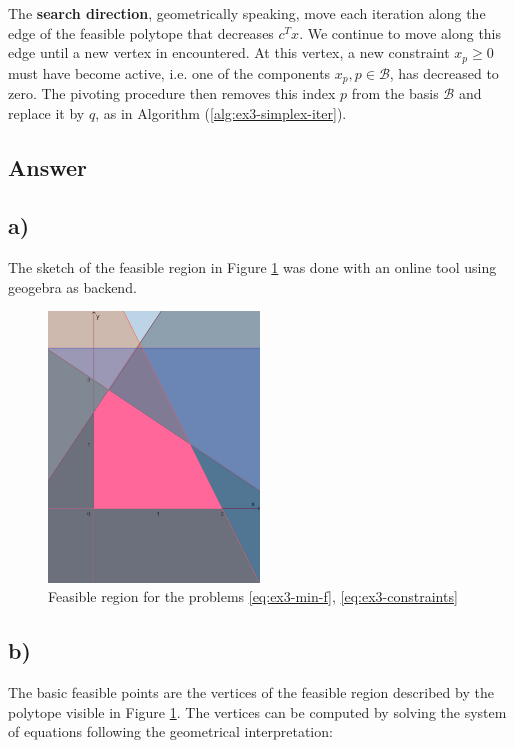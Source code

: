 \documentclass[unicode,11pt,a4paper,oneside,numbers=endperiod,openany]{scrartcl}
\begin{document}
The \textbf{search direction}, geometrically speaking, 
move each iteration along the edge of the feasible polytope that decreases \( c^T x \).
We continue to move along this edge until a new vertex in encountered.
At this vertex, a new constraint \( x_p \geq 0 \) must have become active,
i.e. one of the components \( x_p, p \in \mathcal{B} \), has decreased to zero.
The pivoting procedure then removes this index \( p \) from the basis \( \mathcal{B} \)
and replace it by \( q \), as in Algorithm (\ref{alg:ex3-simplex-iter}).

\subsection{Answer}

\subsection*{a)}

The sketch of the feasible region in Figure \ref{fig:feasible-region}
was done with an online tool using geogebra as backend.

\begin{figure}[htbp]
    \centering
    \includegraphics[width=0.5\textwidth]{./figures/ex3-feasible-region.png}
    \caption{Feasible region for the problems \ref{eq:ex3-min-f}, \ref{eq:ex3-constraints}}
    \label{fig:feasible-region}
\end{figure}

\subsection*{b)}

The basic feasible points are the vertices of the feasible region described by the polytope
visible in Figure \ref{fig:feasible-region}.
The vertices can be computed by solving the system of equations
following the geometrical interpretation:
\end{document}
